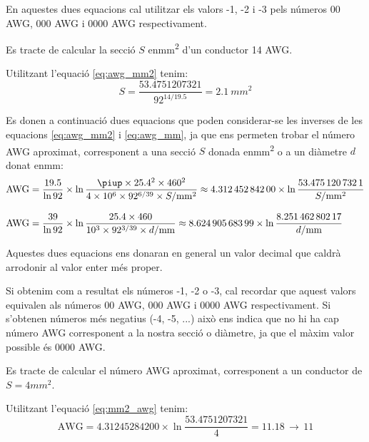 En aquestes dues equacions cal utilitzar els valors -1, -2 i -3  pels números 00 AWG,
000 AWG i 0000 AWG respectivament.

\begin{exemple}
    Es tracte de calcular la secció $S$ en\unit{mm^2} d'un conductor 14 AWG.

    Utilitzant l'equació \eqref{eq:awg_mm2} tenim:
    \[
        S = \dfrac{\num{53,4751207321}}{92^{14/\num{19,5}}} = \SI{2,1}{mm^2}
    \]
\end{exemple}


Es donen a continuació dues equacions que poden considerar-se les inverses de les equacions \eqref{eq:awg_mm2} i \eqref{eq:awg_mm}, ja que ens permeten trobar el número AWG aproximat, corresponent a una secció $S$ donada en\unit{mm^2} o a un diàmetre $d$ donat en\unit{mm}:
\begin{align}
   \text{AWG} &= \frac{\num{19,5}}{\ln 92} \times \ln \frac{\piup \times
   \num{25,4}^2 \times 460^2}{4 \times 10^6 \times 92^{6/39} \times S/\si{mm^2}} \approx
   \num{4,31245284200} \times \ln \frac{\num{53,4751207321}}{S/\si{mm^2}}\label{eq:mm2_awg} \\[2ex]
   \text{AWG} &= \frac{39}{\ln 92} \times \ln \frac{\num{25,4} \times 460}{10^3 \times 92^{3/39} \times d/\si{mm}} \approx
   \num{8,62490568399} \times \ln \frac{\num{8,25146280217}}{d/\si{mm}}\label{eq:mm_awg}
\end{align}

Aquestes dues equacions ens donaran en general un valor decimal que caldrà arrodonir al valor enter  més proper.

Si obtenim com a resultat els números -1, -2 o -3, cal recordar que aquest valors equivalen als números 00 AWG,
000 AWG i 0000 AWG respectivament. Si s'obtenen números més negatius (-4, -5, ...) això ens indica que no hi ha cap número AWG corresponent a la nostra secció o diàmetre, ja que el màxim valor possible és 0000 AWG.

\begin{exemple}
    Es tracte de calcular el número AWG aproximat, corresponent a un conductor de $S=4\unit{mm^2}$.

    Utilitzant l'equació \eqref{eq:mm2_awg} tenim:
    \[
        \text{AWG} = \num{4,31245284200} \times \ln \dfrac{\num{53,4751207321}}{4} =
        \num{11,18} \, \rightarrow \, 11
    \]
\end{exemple}

